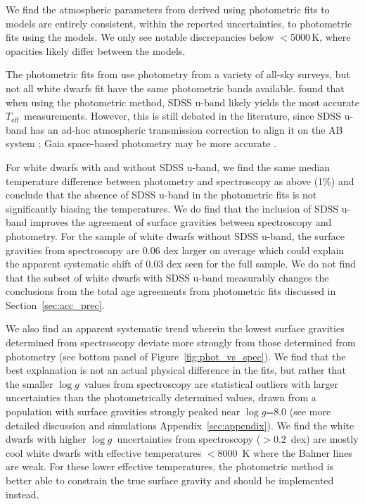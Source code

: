 \documentclass[twocolumn]{aastex631}
\newcommand{\logg}{$\log{g}$}
\newcommand{\teff}{${T}_{\mathrm{eff}}$}
\begin{document}
We find the atmospheric parameters from \citet{2022ApJ...934..148H} derived using photometric fits to \cite{2010MmSAI..81..921K} models are entirely consistent, within the reported uncertainties, to photometric fits using the \citet{2011ApJ...730..128T} models. We only see notable discrepancies below $<$5000\,K, where opacities likely differ between the models.

The photometric fits from \cite{2022ApJ...934..148H} use photometry from a variety of all-sky surveys, but not all white dwarfs fit have the same photometric bands available. \cite{2019ApJ...876...67B} found that when using the photometric method, SDSS u-band likely yields the most accurate \teff\ measurements. However, this is still debated in the literature, since SDSS u-band has an ad-hoc atmospheric transmission correction to align it on the AB system \citep{2006ApJS..167...40E}; Gaia space-based photometry may be more accurate \citep{2019MNRAS.482.5222T,2019MNRAS.482.4570G,2020MNRAS.499.1890M}.

For white dwarfs with and without SDSS u-band, we find the same median temperature difference between photometry and spectroscopy as above (1\%) and conclude that the absence of SDSS u-band in the photometric fits is not significantly biasing the temperatures. We do find that the inclusion of SDSS u-band improves the agreement of surface gravities between spectroscopy and photometry. For the sample of white dwarfs without SDSS u-band, the surface gravities from spectroscopy are 0.06 dex larger on average which could explain the apparent systematic shift of 0.03 dex seen for the full sample. We do not find that the subset of white dwarfs with SDSS u-band measurably changes the conclusions from the total age agreements from photometric fits discussed in Section~\ref{sec:acc_prec}.

We also find an apparent systematic trend wherein the lowest surface gravities determined from spectroscopy deviate more strongly from those determined from photometry (see bottom panel of Figure~\ref{fig:phot_vs_spec}). We find that the best explanation is not an actual physical difference in the fits, but rather that the smaller \logg\ values from spectroscopy are statistical outliers with larger uncertainties than the photometrically determined values, drawn from a population with surface gravities strongly peaked near \logg=8.0 (see more detailed discussion and simulations Appendix~\ref{sec:appendix}). We find the white dwarfs with higher \logg\ uncertainties from spectroscopy ($>0.2$~dex) are mostly cool white dwarfs with effective temperatures $<$8000~K where the Balmer lines are weak. For these lower effective temperatures, the photometric method is better able to constrain the true surface gravity and should be implemented instead.
\end{document}
